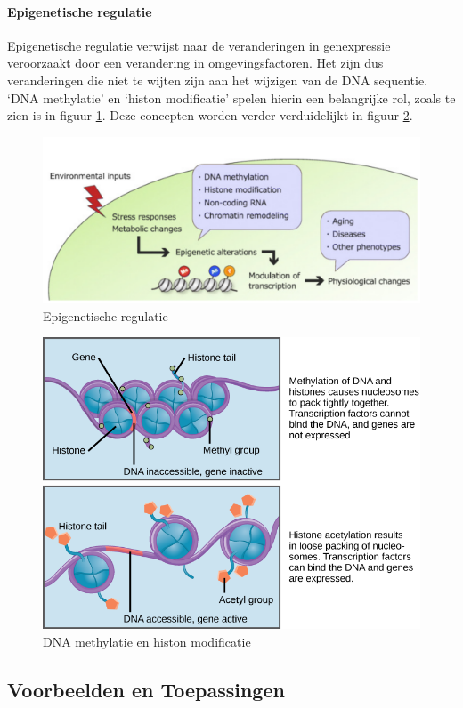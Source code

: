 \documentclass[a4paper,kul]{kulakarticle} %
\begin{document}
\paragraph{Epigenetische regulatie}
Epigenetische regulatie verwijst naar de veranderingen in genexpressie veroorzaakt door een verandering in omgevingsfactoren. Het zijn dus veranderingen die niet te wijten zijn aan het wijzigen van de DNA sequentie. `DNA methylatie' en `histon modificatie' spelen hierin een belangrijke rol, zoals te zien is in figuur \ref{fig:epigenetischeregulatie}. Deze concepten worden verder verduidelijkt in figuur \ref{fig:methylationhistone}.
\begin{figure}[h]
	\centering
	\includegraphics[width=0.7\linewidth]{EpigenetischeRegulatie}
	\caption[Epigenetische regulatie]{Epigenetische regulatie}
	\label{fig:epigenetischeregulatie}
\end{figure}
\begin{figure}[h]
	\centering
	\includegraphics[width=0.7\linewidth]{methylationhistone}
	\caption[DNA methylatie en histon modificatie]{DNA methylatie en histon modificatie}
	\label{fig:methylationhistone}
\end{figure}

\newpage
\subsection{Voorbeelden en Toepassingen}
\end{document}

